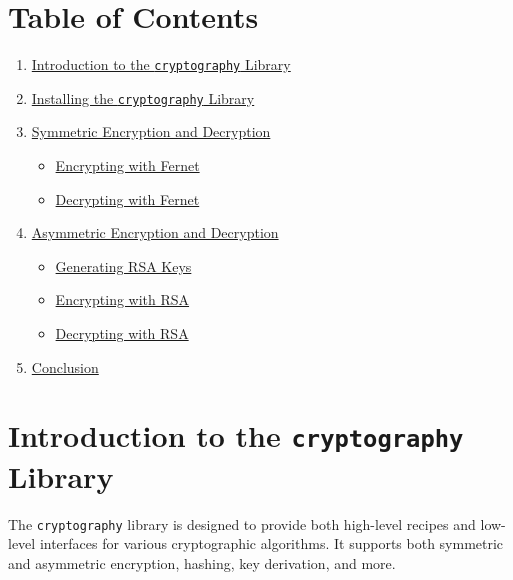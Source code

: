 \documentclass[
  letterpaper,
  DIV=11,
  numbers=noendperiod]{scrreprt}
\providecommand{\tightlist}{%
  \setlength{\itemsep}{0pt}\setlength{\parskip}{0pt}}\usepackage{longtable,booktabs,array}
\begin{document}
\section{Table of Contents}\label{table-of-contents-20}

\begin{enumerate}
\def\labelenumi{\arabic{enumi}.}
\tightlist
\item
  \hyperref[introduction-to-the-cryptography-library]{Introduction to
  the \texttt{cryptography} Library}
\item
  \hyperref[installing-the-cryptography-library]{Installing the
  \texttt{cryptography} Library}
\item
  \hyperref[symmetric-encryption-and-decryption]{Symmetric Encryption
  and Decryption}

  \begin{itemize}
  \tightlist
  \item
    \hyperref[encrypting-with-fernet]{Encrypting with Fernet}
  \item
    \hyperref[decrypting-with-fernet]{Decrypting with Fernet}
  \end{itemize}
\item
  \hyperref[asymmetric-encryption-and-decryption]{Asymmetric Encryption
  and Decryption}

  \begin{itemize}
  \tightlist
  \item
    \hyperref[generating-rsa-keys]{Generating RSA Keys}
  \item
    \hyperref[encrypting-with-rsa]{Encrypting with RSA}
  \item
    \hyperref[decrypting-with-rsa]{Decrypting with RSA}
  \end{itemize}
\item
  \hyperref[conclusion]{Conclusion}
\end{enumerate}

\section{\texorpdfstring{Introduction to the \texttt{cryptography}
Library}{Introduction to the cryptography Library}}\label{introduction-to-the-cryptography-library}

The \texttt{cryptography} library is designed to provide both high-level
recipes and low-level interfaces for various cryptographic algorithms.
It supports both symmetric and asymmetric encryption, hashing, key
derivation, and more.
\end{document}
